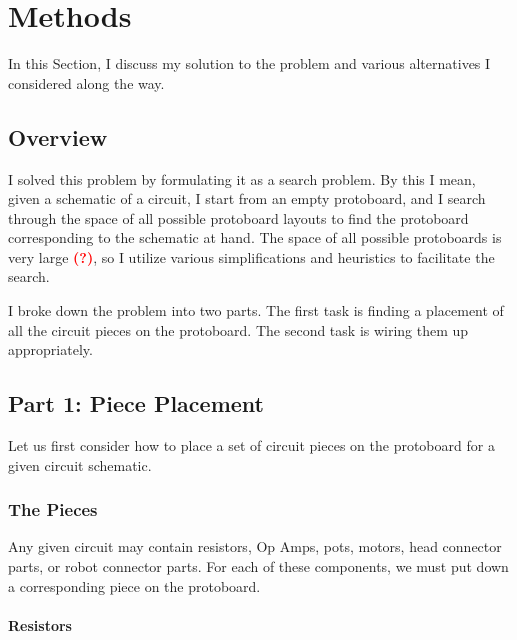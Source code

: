 
\chapter{Methods}

In this Section, I discuss my solution to the problem and various alternatives I
considered along the way.

\section{Overview}

I solved this problem by formulating it as a search problem. By this I mean,
given a schematic of a circuit, I start from an empty protoboard, and I search
through the space of all possible protoboard layouts to find the protoboard
corresponding to the schematic at hand. The space of all possible protoboards is
very large \textcolor{red}{\textbf{(?)}}, so I utilize various simplifications
and heuristics to facilitate the search.

I broke down the problem into two parts. The first task is finding a placement
of all the circuit pieces on the protoboard. The second task is wiring them up
appropriately.

\section{Part 1: Piece Placement}

Let us first consider how to place a set of circuit pieces on the protoboard for
a given circuit schematic.

\subsection{The Pieces}

Any given circuit may contain resistors, Op Amps, pots, motors, head connector
parts, or robot connector parts. For each of these components, we must put down
a corresponding piece on the protoboard.

\subsubsection{Resistors}
\label{sec:resistor_pieces}

